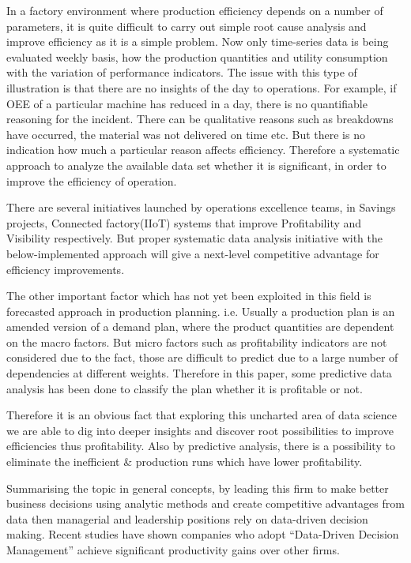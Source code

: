  In a factory environment where production efficiency depends on a number of parameters, it is quite difficult to carry out simple root cause analysis and improve efficiency as it is a simple problem. Now only time-series data is being evaluated weekly basis, how the production quantities and utility consumption with the variation of performance indicators. The issue with this type of illustration is that there are no insights of the day to operations. For example, if OEE of a particular machine has reduced in a day, there is no quantifiable reasoning for the incident. There can be qualitative reasons such as breakdowns have occurred, the material was not delivered on time etc. But there is no indication how much a particular reason affects efficiency. Therefore a systematic approach to analyze the available data set whether it is significant, in order to improve the efficiency of operation.

There are several initiatives launched by operations excellence teams, in Savings projects, Connected factory(IIoT) systems that improve Profitability and Visibility respectively. But proper systematic data analysis initiative with the below-implemented approach will give a next-level competitive advantage for efficiency improvements.

The other important factor which has not yet been exploited in this field is forecasted approach in production planning. i.e. Usually a production plan is an amended version of a demand plan, where the product quantities are dependent on the macro factors. But micro factors such as profitability indicators are not considered due to the fact, those are difficult to predict due to a large number of dependencies at different weights. Therefore in this paper, some predictive data analysis has been done to classify the plan whether it is profitable or not.

Therefore it is an obvious fact that exploring this uncharted area of data science we are able to dig into deeper insights and discover root possibilities to improve efficiencies thus profitability. Also by predictive analysis, there is a possibility to eliminate the inefficient \& production runs which have lower profitability.

Summarising the topic in general concepts, by leading this firm to make better business decisions using analytic methods and create competitive advantages from data then managerial and leadership positions rely on data-driven decision making. Recent studies have shown companies who adopt “Data-Driven Decision Management” achieve significant productivity gains over other firms.



